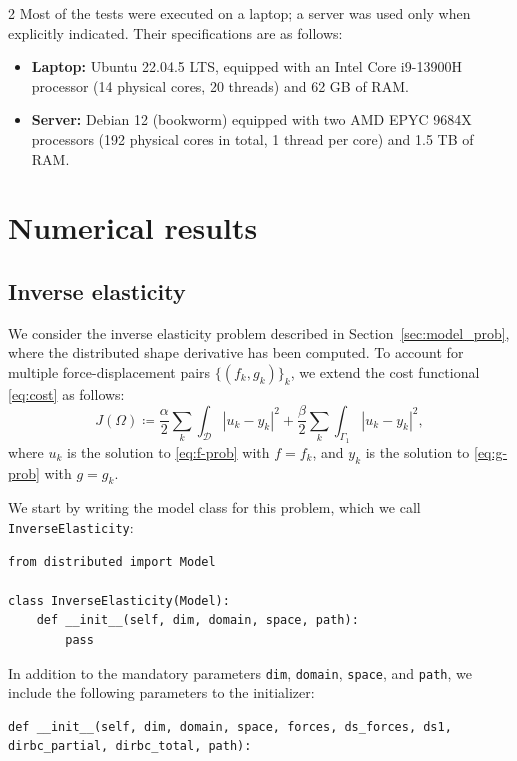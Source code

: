 \documentclass[a4paper, oneside]{article}
\newcommand{\code}[1]{\texttt{#1}}
\begin{document}
\begin{multicols}{2}
Most of the tests were executed on a laptop; a server was used only when explicitly indicated.
Their specifications are as follows:
\begin{itemize}[left=0.0em]
\item \textbf{Laptop:} Ubuntu 22.04.5 LTS, equipped with an Intel Core i9-13900H
processor (14 physical cores, 20 threads) and 62 GB of RAM.
\item \textbf{Server:} Debian 12 (bookworm) equipped with two AMD EPYC 9684X
processors (192 physical cores in total, 1 thread per core) and 1.5 TB of RAM.
\end{itemize}

\section{Numerical results}
\label{sec:results}


\subsection{Inverse elasticity}
\label{sec:num_inverse_elasticity}

We consider the inverse elasticity problem described in Section~\ref{sec:model_prob},
where the distributed shape derivative has been computed.
To account for multiple force-displacement pairs $\{(f_k, g_k)\}_k$,
we extend the cost functional \eqref{eq:cost} as follows:
\begin{equation}
	J(\Omega)\coloneqq
	\frac{\alpha}{2}\sum_{k}\int_{\mathcal{D}}|u_{k}-y_{k}|^{2}+
	\frac{\beta}{2}\sum_{k}\int_{\Gamma_{1}}|u_{k}-y_{k}|^{2},
\end{equation}
where $u_k$ is the solution to \eqref{eq:f-prob} with $f=f_k$,
and $y_k$ is the solution to \eqref{eq:g-prob} with $g=g_k$.

We start by writing the model class for this problem,
which we call \code{InverseElasticity}:
\begin{lstlisting}
from distributed import Model

class InverseElasticity(Model):
	def __init__(self, dim, domain, space, path):
		pass
\end{lstlisting}
In addition to the mandatory parameters
\code{dim}, \code{domain}, \code{space}, and \code{path},
we include the following parameters to the initializer:
\begin{lstlisting}
def __init__(self, dim, domain, space, forces, ds_forces, ds1, dirbc_partial, dirbc_total, path):
\end{lstlisting}


\end{multicols}
\end{document}
